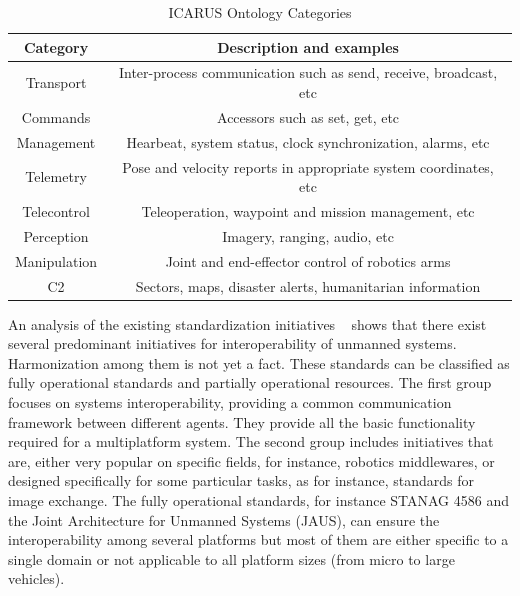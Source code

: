 \documentclass{article}
\begin{document}
\begin{table}[h!]
\centering
\begin{tabular}{| c | c |}
\hline
Category & Description and examples \\
\hline
Transport & Inter-process communication such as send, receive, broadcast, etc\\ \hline
Commands & Accessors such as set, get, etc\\ \hline
Management & Hearbeat, system status, clock synchronization, alarms, etc\\ \hline
Telemetry  & Pose and velocity reports in appropriate system coordinates, etc\\ \hline
Telecontrol & Teleoperation, waypoint and mission management, etc \\ \hline
Perception & Imagery, ranging, audio, etc\\ \hline
Manipulation & Joint and end-effector control of robotics arms\\ \hline
C2 & Sectors, maps, disaster alerts, humanitarian information\\ \hline
\end{tabular}
\caption{ICARUS Ontology Categories}
\label{table:Ontology}
\end{table}

An analysis of the existing standardization initiatives ~\cite{serrano_interoperability} shows that there exist several predominant initiatives for interoperability of unmanned systems. Harmonization among them is not yet a fact. These standards can be classified as fully operational standards and partially operational resources. The first group focuses on systems interoperability, providing a common communication framework between different agents. They provide all the basic functionality required for a multiplatform system. The second group includes initiatives that are, either very popular on specific fields, for instance, robotics middlewares, or designed specifically for some particular tasks, as for instance, standards for image exchange.  The fully operational standards, for instance STANAG 4586 and the Joint Architecture for Unmanned Systems (JAUS), can ensure the interoperability among several platforms but most of them are either specific to a single domain or not applicable to all platform sizes (from micro to large vehicles).
\end{document}
